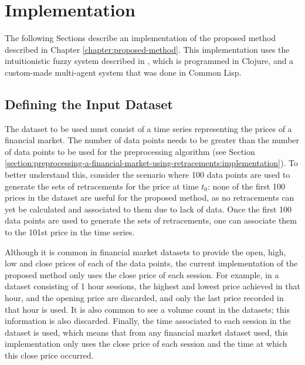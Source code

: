 \chapter{Implementation}
\label{chapter:implementation}

The following Sections describe an implementation of the proposed method
described in Chapter \ref{chapter:proposed-method}. This implementation uses the
intuitionistic fuzzy system described in \cite{Hernandez-Aguila2017}, which is
programmed in Clojure, and a custom-made multi-agent system that was done in
Common Lisp. %

\section{Defining the Input Dataset}
\label{section:defining-the-input-dataset}

The dataset to be used must consist of a time series representing the prices
of a financial market. The number of data points needs to be greater than the
number of data points to be used for the preprocessing algorithm (see Section
\ref{section:preprocessing-a-financial-market-using-retracements:implementation}). To
better understand this, consider the scenario where 100 data points are used to
generate the sets of retracements for the price at time $t_0$: none of the first
100 prices in the dataset are useful for the proposed method, as no retracements
can yet be calculated and associated to them due to lack of data. Once the first
100 data points are used to generate the sets of retracements, one can associate
them to the 101st price in the time series.

Although it is common in financial market datasets to provide the open, high,
low and close prices of each of the data points, the current implementation of the
proposed method only uses the close price of each session. For example, in a
dataset consisting of 1 hour sessions, the highest and lowest price achieved in
that hour, and the opening price are discarded, and only the last price recorded
in that hour is used. It is also common to see a volume count in the datasets;
this information is also discarded. Finally, the time associated to each session
in the dataset is used, which means that from any financial market dataset used,
this implementation only uses the close price of each session and the time at
which this close price occurred. 

